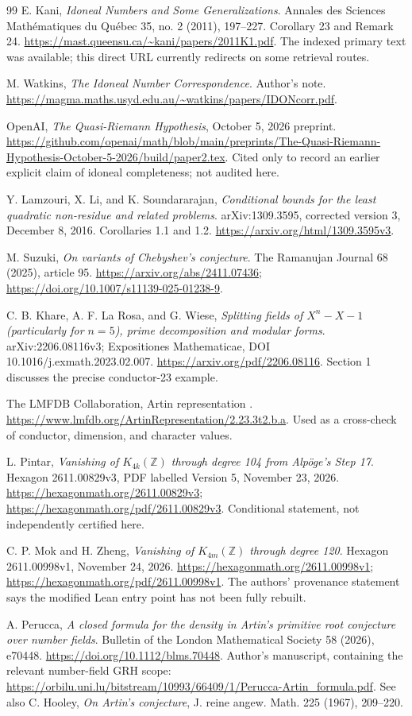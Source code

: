 \documentclass[11pt,letterpaper]{article}
\theoremstyle{definition}
\theoremstyle{remark}
\newcommand{\Z}{\mathbb Z}
\newcommand{\code}[1]{\texttt{\small\detokenize{#1}}}
\begin{document}
\begin{thebibliography}{99}
E. Kani,
\emph{Idoneal Numbers and Some Generalizations}.
Annales des Sciences Math\'ematiques du Qu\'ebec 35, no. 2
(2011), 197--227. Corollary 23 and Remark 24.
\url{https://mast.queensu.ca/~kani/papers/2011K1.pdf}.
The indexed primary text was available; this direct URL currently
redirects on some retrieval routes.

M. Watkins,
\emph{The Idoneal Number Correspondence}.
Author's note.
\url{https://magma.maths.usyd.edu.au/~watkins/papers/IDONcorr.pdf}.

OpenAI,
\emph{The Quasi-Riemann Hypothesis},
October 5, 2026 preprint.
\url{https://github.com/openai/math/blob/main/preprints/The-Quasi-Riemann-Hypothesis-October-5-2026/build/paper2.tex}.
Cited only to record an earlier explicit claim of idoneal
completeness; not audited here.

Y. Lamzouri, X. Li, and K. Soundararajan,
\emph{Conditional bounds for the least quadratic non-residue and
related problems}.
arXiv:1309.3595, corrected version 3, December 8, 2016.
Corollaries 1.1 and 1.2.
\url{https://arxiv.org/html/1309.3595v3}.

M. Suzuki,
\emph{On variants of Chebyshev's conjecture}.
The Ramanujan Journal 68 (2025), article 95.
\url{https://arxiv.org/abs/2411.07436};
\url{https://doi.org/10.1007/s11139-025-01238-9}.

C. B. Khare, A. F. La Rosa, and G. Wiese,
\emph{Splitting fields of \(X^n-X-1\) (particularly for \(n=5\)),
prime decomposition and modular forms}.
arXiv:2206.08116v3; Expositiones Mathematicae,
DOI 10.1016/j.exmath.2023.02.007.
\url{https://arxiv.org/pdf/2206.08116}.
Section 1 discusses the precise conductor-23 example.

The LMFDB Collaboration,
Artin representation \code{2.23.3t2.b.a}.
\url{https://www.lmfdb.org/ArtinRepresentation/2.23.3t2.b.a}.
Used as a cross-check of conductor, dimension, and character values.

L. Pintar,
\emph{Vanishing of \(K_{4k}(\Z)\) through degree 104 from
Alp\"oge's Step 17}.
Hexagon 2611.00829v3, PDF labelled Version 5, November 23, 2026.
\url{https://hexagonmath.org/2611.00829v3};
\url{https://hexagonmath.org/pdf/2611.00829v3}.
Conditional statement, not independently certified here.

C. P. Mok and H. Zheng,
\emph{Vanishing of \(K_{4m}(\Z)\) through degree 120}.
Hexagon 2611.00998v1, November 24, 2026.
\url{https://hexagonmath.org/2611.00998v1};
\url{https://hexagonmath.org/pdf/2611.00998v1}.
The authors' provenance statement says the modified Lean entry
point has not been fully rebuilt.

A. Perucca,
\emph{A closed formula for the density in Artin's primitive
root conjecture over number fields}.
Bulletin of the London Mathematical Society 58 (2026), e70448.
\url{https://doi.org/10.1112/blms.70448}.
Author's manuscript, containing the relevant number-field GRH scope:
\url{https://orbilu.uni.lu/bitstream/10993/66409/1/Perucca-Artin_formula.pdf}.
See also C. Hooley, \emph{On Artin's conjecture},
J. reine angew. Math. 225 (1967), 209--220.
\end{thebibliography}
\end{document}
